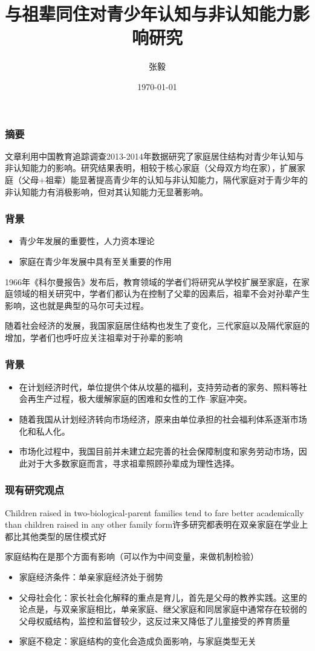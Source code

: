 \documentclass{beamer}
\title[三代同住、隔代同住]{与祖辈同住对青少年认知与非认知能力影响研究}
\author{张毅}
\date{\today}
\begin{document}
\frame{\titlepage}


\begin{frame}
\frametitle{摘要}
文章利用中国教育追踪调查2013-2014年数据研究了家庭居住结构对青少年认知与非认知能力的影响。研究结果表明，相较于核心家庭（父母双方均在家），扩展家庭（父母+祖辈）能显著提高青少年的认知与非认知能力，隔代家庭对于青少年的非认知能力有消极影响，但对其认知能力无显著影响。
\end{frame}


\begin{frame}
	\frametitle{背景}
\begin{itemize}
		\item 青少年发展的重要性，人力资本理论
		\item 家庭在青少年发展中具有至关重要的作用
\end{itemize}
\par 1966年《科尔曼报告》发布后，教育领域的学者们将研究从学校扩展至家庭，在家庭领域的相关研究中，学者们都认为在控制了父辈的因素后，祖辈不会对孙辈产生影响，这也就是典型的马尔可夫过程。
\par 随着社会经济的发展，我国家庭居住结构也发生了变化，三代家庭以及隔代家庭的增加，学者们也呼吁应关注祖辈对于孙辈的影响\citep{mare_multigenerational_2011,张帆2020,zeng_effects_2014}
\end{frame}
\begin{frame}
	\frametitle{背景}

	\begin{itemize}
	\item 在计划经济时代，单位提供个体从坟墓的福利，支持劳动者的家务、照料等社会再生产过程，极大缓解家庭的困难和女性的工作--家庭冲突\citep{ji_young_2020}。
	\item 随着我国从计划经济转向市场经济，原来由单位承担的社会福利体系逐渐市场化和私人化。
	\item 市场化过程中，我国目前并未建立起完善的社会保障制度和家务劳动市场\citep{张帆2020}，因此对于大多数家庭而言，寻求祖辈照顾孙辈成为理性选择。 
\end{itemize}

\end{frame}



\begin{frame}
	\frametitle{现有研究观点} %
Children raised in two-biological-parent families tend to fare better academically than children raised in any other family form\citep{brown_marriage_2010}许多研究都表明在双亲家庭在学业上都比其他类型的居住模式好
\par 家庭结构在是那个方面有影响（可以作为中间变量，来做机制检验）
\begin{itemize}
	\item 家庭经济条件：单亲家庭经济处于弱势
	\item 父母社会化：家长社会化解释的重点是育儿，首先是父母的教养实践。这里的论点是，与双亲家庭相比，单亲家庭、继父家庭和同居家庭中通常存在较弱的父母权威结构，监控和监督较少，这反过来又降低了儿童接受的养育质量
	\item 家庭不稳定：家庭结构的变化会造成负面影响，与家庭类型无关
\end{itemize}
\end{frame}
\end{document}
